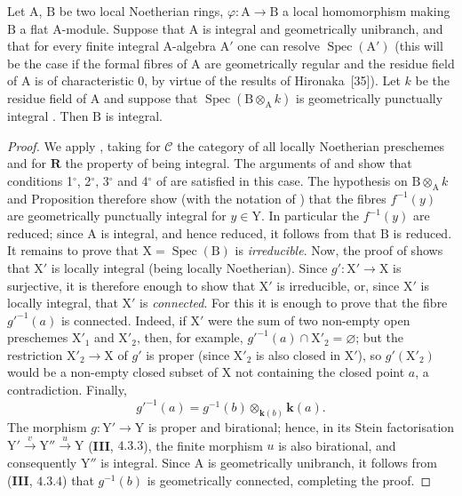 \begin{corollary}[7.9.9]
\label{IV.7.9.9}
Let $\mathrm{A}$, $\mathrm{B}$ be two local Noetherian rings, $\varphi:\mathrm{A}\to\mathrm{B}$ a local homomorphism making $\mathrm{B}$ a flat $\mathrm{A}$-module. Suppose that $\mathrm{A}$ is integral and geometrically unibranch, and that for every finite integral $\mathrm{A}$-algebra $\mathrm{A}'$ one can resolve $\operatorname{Spec}(\mathrm{A}')$ (this will be the case if the formal fibres of $\mathrm{A}$ are geometrically regular and the residue field of $\mathrm{A}$ is of characteristic $0$, by virtue of the results of Hironaka~[35]). Let $k$ be the residue field of $\mathrm{A}$ and suppose that $\operatorname{Spec}(\mathrm{B}\otimes_\mathrm{A} k)$ is geometrically punctually integral . Then $\mathrm{B}$ is integral.
\end{corollary}

\begin{proof}
We apply , taking for $\mathcal{C}$ the category of all locally Noetherian preschemes and for $\boldsymbol{R}$ the property of being integral. The arguments of  and  show that conditions 1${}^\circ$, 2${}^\circ$, 3${}^\circ$ and 4${}^\circ$ of  are satisfied in this case. The hypothesis on $\mathrm{B}\otimes_\mathrm{A}k$ and Proposition  therefore show (with the notation of ) that the fibres $f^{-1}(y)$ are geometrically punctually integral for $y\in\mathrm{Y}$. In particular the $f^{-1}(y)$ are reduced; since $\mathrm{A}$ is integral, and hence reduced, it follows from  that $\mathrm{B}$ is reduced. It remains to prove that $\mathrm{X}=\operatorname{Spec}(\mathrm{B})$ is \emph{irreducible}. Now, the proof of  shows that $\mathrm{X}'$ is locally integral (being locally Noetherian). Since $g':\mathrm{X}'\to\mathrm{X}$ is surjective, it is therefore enough to show that $\mathrm{X}'$ is irreducible, or, since $\mathrm{X}'$ is locally integral, that $\mathrm{X}'$ is \emph{connected}. For this it is enough to prove that the fibre $g'^{-1}(a)$ is connected. Indeed, if $\mathrm{X}'$ were the sum of two non-empty open preschemes $\mathrm{X}'_1$ and $\mathrm{X}'_2$, then, for example, $g'^{-1}(a)\cap\mathrm{X}'_2=\varnothing$; but the restriction $\mathrm{X}'_2\to\mathrm{X}$ of $g'$ is proper (since $\mathrm{X}'_2$ is also closed in $\mathrm{X}'$), so $g'(\mathrm{X}'_2)$ would be a non-empty closed subset of $\mathrm{X}$ not containing the closed point $a$, a contradiction. Finally,
\[
  g'^{-1}(a)=g^{-1}(b)\otimes_{\boldsymbol{k}(b)}\boldsymbol{k}(a).
\]
The morphism $g:\mathrm{Y}'\to\mathrm{Y}$ is proper and birational; hence, in its Stein factorisation $\mathrm{Y}'\xrightarrow{v}\mathrm{Y}''\xrightarrow{u}\mathrm{Y}$ (\textbf{III}, $4.3.3$), the finite morphism $u$ is also birational, and consequently $\mathrm{Y}''$ is integral. Since $\mathrm{A}$ is geometrically unibranch, it follows from (\textbf{III}, $4.3.4$) that $g^{-1}(b)$ is geometrically connected, completing the proof.
\end{proof}

